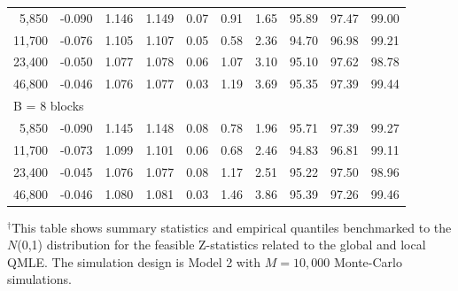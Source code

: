 \documentclass[11pt]{article}
\numberwithin{equation}{section}
\theoremstyle{plain}
\theoremstyle{remark}
\begin{document}
\begin{table}[]
\begin{tabular}{@{}rccccccccc@{}}
5,850 &-0.090&1.146&1.149&0.07&0.91&1.65&95.89&97.47&99.00
\\
11,700 &-0.076&1.105&1.107&0.05&0.58&2.36&94.70&96.98&99.21
\\
23,400 & -0.050&1.077&1.078&0.06&1.07&3.10&95.10&97.62&98.78\\
46,800 & -0.046&1.076&1.077&0.03&1.19&3.69&95.35&97.39&99.44
\\
\multicolumn{10}{l}{B = 8 blocks} \\
5,850 &-0.090&1.145&1.148&0.08&0.78&1.96&95.71&97.39&99.27
\\
11,700 & -0.073&1.099&1.101&0.06&0.68&2.46&94.83&96.81&99.11
\\
23,400 &-0.045&1.076&1.077&0.08&1.17&2.51&95.22&97.50&98.96\\
46,800 &-0.046&1.080&1.081&0.03&1.46&3.86&95.39&97.26&99.46
\\
\bottomrule
\end{tabular}

\scriptsize $^\dag$This table shows summary statistics and empirical quantiles benchmarked to the $N$(0,1) distribution for the feasible Z-statistics related to the global and local QMLE. The simulation design is Model 2 with $M = 10,000$ Monte-Carlo simulations. 
\end{table}
\end{document}
